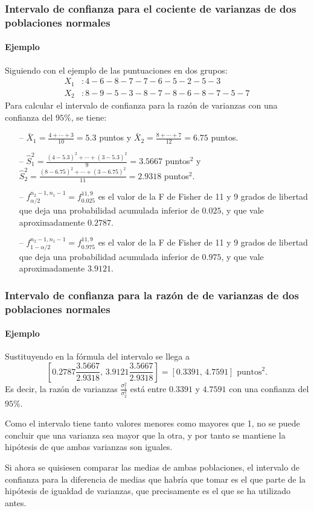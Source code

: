 \begin{frame}
\frametitle{Intervalo de confianza para el cociente de varianzas de dos poblaciones normales}
\framesubtitle{Ejemplo}
Siguiendo con el ejemplo de las puntuaciones en dos grupos:
\begin{align*}
X_1 &: 4 - 6 - 8 - 7 - 7 - 6 - 5 - 2 - 5 - 3 \\
X_2 &: 8 - 9 - 5 - 3 - 8 - 7 - 8 - 6 - 8 - 7 - 5 - 7  
\end{align*}
Para calcular el intervalo de confianza para la razón de varianzas con una confianza del $95\%$, se tiene:
\begin{itemize}
\item[--] $\bar{X}_1 = \frac{4+\cdots +3}{10}=5.3$ puntos y $\bar{X}_2=\frac{8+\cdots +7}{12}=6.75$ puntos.
\item[--] $\hat{S}_1^2= \frac{(4-5.3)^2+\cdots + (3-5.3)^2}{9}=3.5667 $ puntos$^2$ y $\hat{S}_2^2=
\frac{(8-6.75)^2+\cdots + (3-6.75)^2}{11}=2.9318$ puntos$^2$.
\item[--] $f^{n_2-1,n_1-1}_{\alpha/2}=f^{11,9}_{0.025}$ es el valor de la F de Fisher de 11 y 9 grados de libertad que
deja una probabilidad acumulada inferior de $0.025$, y que vale aproximadamente $0.2787$.
\item[--] $f^{n_2-1,n_1-1}_{1-\alpha/2}=f^{11,9}_{0.975}$ es el valor de la F de Fisher de 11 y 9 grados de libertad
que deja una probabilidad acumulada inferior de $0.975$, y que vale aproximadamente $3.9121$.
\end{itemize}
\end{frame}


\begin{frame}
\frametitle{Intervalo de confianza para la razón de de varianzas de dos poblaciones normales}
\framesubtitle{Ejemplo}
Sustituyendo en la fórmula del intervalo se llega a
\[
\left[0.2787\frac{3.5667}{2.9318},\, 3.9121\frac{3.5667}{2.9318}\right] = [0.3391,\, 4.7591] \text{ puntos}^2.
\]
Es decir, la razón de varianzas $\frac{\sigma_1^2}{\sigma_2^2}$ está entre $0.3391$ y $4.7591$ con una confianza del
$95\%$.

Como el intervalo tiene tanto valores menores como mayores que 1, no se puede concluir que una varianza sea mayor que la otra, y por tanto se mantiene la hipótesis de que ambas varianzas son iguales.

Si ahora se quisiesen comparar las medias de ambas poblaciones, el intervalo de confianza para la diferencia de medias que habría que tomar es el que parte de la hipótesis de igualdad de varianzas, que precisamente es el que se ha utilizado antes. 
\end{frame}


